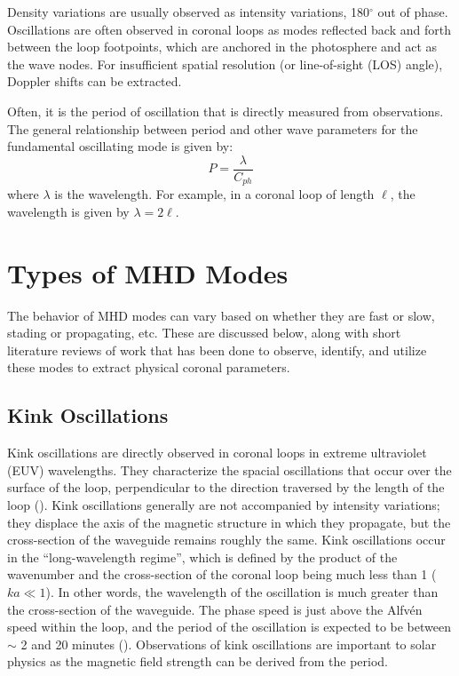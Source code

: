 \documentclass[preprint2]{aastex}
\begin{document}
Density variations are usually observed as intensity variations,
180$^{\circ}$ out of phase.
Oscillations are often observed in coronal loops as modes reflected back
and forth between the loop footpoints, which are
anchored in the photosphere and act as the wave nodes.
For insufficient spatial resolution (or line-of-sight (LOS) angle),
Doppler shifts can be extracted.

Often, it is the period of oscillation that is directly
measured from observations. The general relationship between period
and other wave parameters for the fundamental oscillating mode is
given by:
\begin{equation}
    P = \frac{\lambda}{C_{ph}}
\end{equation}
where $\lambda$ is the wavelength. For example, in a coronal loop of length
$\ell$, the wavelength is given by $\lambda = 2\ell$.

\section{Types of MHD Modes}\label{topics}
The behavior of MHD modes can vary based on whether they are fast or slow,
stading or propagating, etc. These are discussed below, along with short
literature reviews of work that has been done to observe, identify, and
utilize these modes to extract physical coronal parameters.

\subsection{Kink Oscillations}\label{kink}
Kink oscillations are directly observed in coronal loops in extreme
ultraviolet (EUV) wavelengths.
They characterize the spacial oscillations that occur over the surface of
the loop, perpendicular to the direction traversed by the length
of the loop (\cite{Nak}).
Kink oscillations generally are not accompanied by intensity variations;
they displace the axis of the magnetic structure in which they propagate,
but the cross-section of the waveguide remains roughly the same.
Kink oscillations occur in the ``long-wavelength regime'',
which is defined by
the product of the wavenumber and the cross-section of the coronal
loop being much less than 1 ($ka \ll 1$). In other words, the
wavelength of the oscillation is much greater than the
cross-section of the waveguide.
The phase speed is just above the Alfv\'en speed within the loop,
and the period of the oscillation is expected to be between
$\sim$ 2 and 20 minutes (\cite{Asc}).
Observations of kink oscillations are important to solar physics as
the magnetic field strength can be derived from the period.
\end{document}
